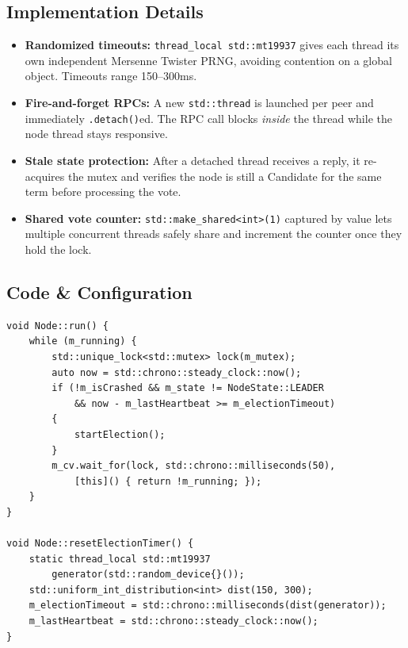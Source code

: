\documentclass[11pt, a4paper]{article}
\begin{document}
\subsection{Implementation Details}
\begin{itemize}[leftmargin=*]
    \item \textbf{Randomized timeouts:} \texttt{thread\_local std::mt19937}
          gives each thread its own independent Mersenne Twister PRNG,
          avoiding contention on a global object. Timeouts range 150--300ms.
    \item \textbf{Fire-and-forget RPCs:} A new \texttt{std::thread} is
          launched per peer and immediately \texttt{.detach()}ed. The RPC
          call blocks \textit{inside} the thread while the node thread stays
          responsive.
    \item \textbf{Stale state protection:} After a detached thread receives
          a reply, it re-acquires the mutex and verifies the node is still a
          Candidate for the same term before processing the vote.
    \item \textbf{Shared vote counter:} \texttt{std::make\_shared<int>(1)}
          captured by value lets multiple concurrent threads safely share
          and increment the counter once they hold the lock.
\end{itemize}

\subsection{Code \& Configuration}
\begin{lstlisting}[style=cppstyle, caption={Node.cpp --- run() and resetElectionTimer()}]
void Node::run() {
    while (m_running) {
        std::unique_lock<std::mutex> lock(m_mutex);
        auto now = std::chrono::steady_clock::now();
        if (!m_isCrashed && m_state != NodeState::LEADER
            && now - m_lastHeartbeat >= m_electionTimeout)
        {
            startElection();
        }
        m_cv.wait_for(lock, std::chrono::milliseconds(50),
            [this]() { return !m_running; });
    }
}

void Node::resetElectionTimer() {
    static thread_local std::mt19937
        generator(std::random_device{}());
    std::uniform_int_distribution<int> dist(150, 300);
    m_electionTimeout = std::chrono::milliseconds(dist(generator));
    m_lastHeartbeat = std::chrono::steady_clock::now();
}
\end{lstlisting}
\end{document}
